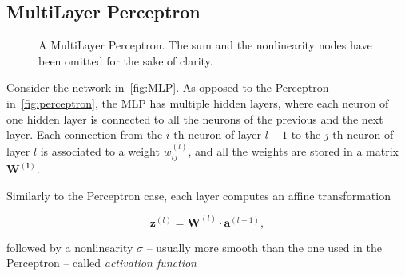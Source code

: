 \subsection{MultiLayer Perceptron}\label{sec:MLP}
\begin{figure}[t]
    \centering
    \begin{neuralnetwork} [nodespacing=7.5mm, layerspacing=23mm,
            maintitleheight=2.5em, layertitleheight=5em,
            height=3, toprow=true, nodesize=17pt,
            style={}, title={}, titlestyle={}]
        \hiddenlayer[count=3, bias=true, title=Layer 1, text=\nodetexthi]
        {\setdefaultlinklabel{\wijllink}\linklayers}
        \hiddenlayer[count=5, bias=true, title=Layer 2, text=\nodetexthi]
        {\setdefaultlinklabel{\wijllink}\linklayers}
        \hiddenlayer[count=4, bias=true, title=Layer 3, text=\nodetexthi]
        {\setdefaultlinklabel{\wijllink}\linklayers}
        \outputlayer[count=1, text=\nodetexty]
        {\setdefaultlinklabel{\wijllink}\linklayers}
    \end{neuralnetwork}
    \centering
    \caption{\label{fig:MLP}A MultiLayer Perceptron. The sum and the
        nonlinearity nodes have been omitted for the sake of clarity.
    }
\end{figure}

\noindent Consider the network in~\autoref{fig:MLP}. As opposed to the
Perceptron in~\autoref{fig:perceptron}, the MLP has multiple hidden layers,
where each neuron of one hidden layer is connected to all the neurons of the
previous and the next layer. Each connection from the $i$-th neuron of layer
$l-1$ to the $j$-th neuron of layer $l$ is associated to a weight
$w_{ij}^{(l)}$, and all the weights are stored in a matrix $\mathbf{W^{(l)}}$.

Similarly to the Perceptron case, each layer computes an affine transformation

\begin{equation}\label{eq:MLP_affine}
    \mathbf{z}^{(l)} = \mathbf{W}^{(l)} \cdot \mathbf{a}^{(l-1)},
\end{equation}

\noindent followed by a nonlinearity $\sigma$ -- usually more smooth than the
one used in the Perceptron -- called \emph{activation function}

